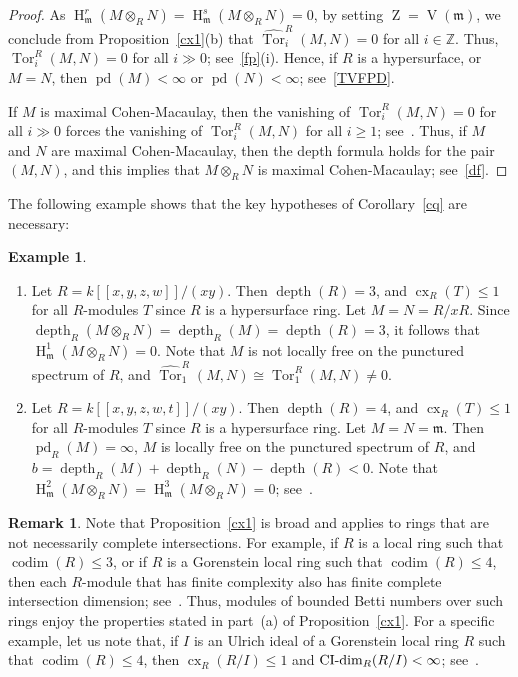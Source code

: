 \documentclass[11pt]{amsart}
\theoremstyle{definition}
\theoremstyle{definition}
\newtheorem{eg}[thm]{Example}
\newtheorem{rmk}[thm]{Remark}
\numberwithin{equation}{section}
\newcommand{\fm}{\mathfrak{m}}
\newcommand{\ZZ}{\mathbb{Z}}
\DeclareMathOperator{\CI}{\textnormal{CI-dim}}
\DeclareMathOperator{\cx}{cx}
\DeclareMathOperator{\V}{V}
\DeclareMathOperator{\mz}{Z}
\DeclareMathOperator{\depth}{depth}
\DeclareMathOperator{\hh}{H}
\DeclareMathOperator{\pd}{pd}
\DeclareMathOperator{\Tor}{Tor}
\DeclareMathOperator{\cod}{codim}
\begin{document}
\begin{proof} As $\hh^r_{\fm}(M\otimes_RN)=\hh^s_{\fm}(M\otimes_RN)=0$, by setting $\mz=\V(\fm)$, we conclude from Proposition~\ref{cx1}(b) that $\widehat{\Tor}_{i}^R(M,N)=0$ for all $i\in\ZZ$. Thus, $\Tor_i^R(M,N)=0$ for all $i\gg0$; see~\ref{fp}(i). Hence, if $R$ is a hypersurface, or $M=N$, then $\pd(M)<\infty$ or $\pd(N)<\infty$; see~\ref{TVFPD}.

If $M$ is maximal Cohen-Macaulay, then the vanishing of $\Tor_i^R(M,N)=0$ for all $i\gg0$ forces the vanishing of $\Tor_i^R(M,N)$ for all $i\geq 1$; see~\cite[2.1]{Jo1}. Thus, if $M$ and $N$ are maximal Cohen-Macaulay, then the depth formula holds for the pair $(M,N)$, and this implies that $M\otimes_RN$ is maximal Cohen-Macaulay; see~\ref{df}.
\end{proof}

The following example shows that the key hypotheses of Corollary~\ref{cq} are necessary:

\begin{eg} $\phantom{}$
\begin{enumerate}[\rm(i)] 
\item Let $R=k[\![x,y,z,w]\!]/(xy)$. Then $\depth(R)=3$, and $\cx_R(T)\leq 1$ for all $R$-modules $T$ since $R$ is a hypersurface ring. Let $M=N=R/xR$. Since $\depth_R(M\otimes_RN)=\depth_R(M)=\depth(R)=3$, it follows that $\hh^1_{\fm}(M\otimes_RN)=0$. Note that $M$ is not locally free on the punctured spectrum of $R$, and $\widehat{\Tor}_{1}^R(M,N)\cong \Tor_1^R(M,N)\neq 0$. \smallskip
		
\item Let $R=k[\![x,y,z,w,t]\!]/(xy)$. Then $\depth(R)=4$, and $\cx_R(T)\leq 1$ for all $R$-modules $T$ since $R$ is a hypersurface ring. Let $M=N=\fm$. Then $\pd_R(M)=\infty$, $M$ is locally free on the punctured spectrum of $R$, and $b=\depth_{R}(M)+\depth_{R}(N)-\depth(R)<0$. Note that $ \hh^{2}_{\fm}(M\otimes_RN)=\hh^{3}_{\fm}(M\otimes_RN) =0$; see~\cite[5.5(i)]{MA}.
\end{enumerate}
\end{eg}

\begin{rmk} Note that Proposition~\ref{cx1} is broad and applies to rings that are not necessarily complete intersections. For example, if $R$ is a local ring such that $\cod(R)\leq 3$, or if $R$ is a Gorenstein local ring such that $\cod(R)\leq 4$, then each $R$-module that has finite complexity also has finite complete intersection dimension; see~\cite[1.5]{CAP}. Thus, modules of bounded Betti numbers over such rings enjoy the properties stated in part~(a) of  Proposition~\ref{cx1}. For a specific example, let us note that, if $I$ is an Ulrich ideal of a Gorenstein local ring $R$ such that $\cod(R)\leq 4$, then $\cx_R(R/I)\leq 1$ and $\CI_R(R/I)<\infty$; see~\cite[7.4]{GotoUlrich}.
\end{rmk}
\end{document}

